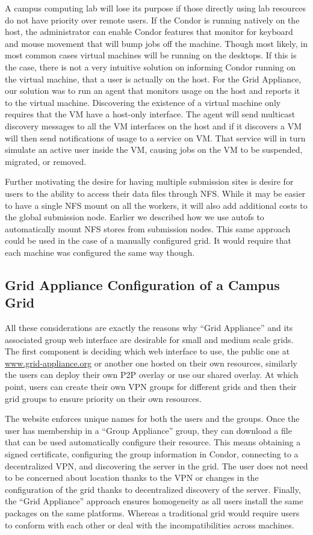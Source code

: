 \documentclass[conference]{IEEEtran}
\begin{document}
A campus computing lab will lose its purpose if those directly using lab
resources do not have priority over remote users.  If the Condor is running
natively on the host, the administrator can enable Condor features that monitor
for keyboard and mouse movement that will bump jobs off the machine.  Though
most likely, in most common cases virtual machines will be running on the
desktops.  If this is the case, there is not a very intuitive solution on
informing Condor running on the virtual machine, that a user is actually on the
host.  For the Grid Appliance, our solution was to run an agent that monitors
usage on the host and reports it to the virtual machine.  Discovering the
existence of a virtual machine only requires that the VM have a host-only
interface.  The agent will send multicast discovery messages to all the VM
interfaces on the host and if it discovers a VM will then send notifications of
usage to a service on VM.  That service will in turn simulate an active user
inside the VM, causing jobs on the VM to be suspended, migrated, or removed.

Further motivating the desire for having multiple submission sites is desire
for users to the ability to access their data files through NFS.  While it may
be easier to have a single NFS mount on all the workers, it will also add
additional costs to the global submission node.  Earlier we described how we
use autofs to automatically mount NFS stores from submission nodes.  This same
approach could be used in the case of a manually configured grid.  It would
require that each machine was configured the same way though.

\subsection{Grid Appliance Configuration of a Campus Grid}

All these considerations are exactly the reasons why ``Grid Appliance'' and its
associated group web interface are desirable for small and medium scale grids.
The first component is deciding which web interface to use, the public one at
\url{www.grid-appliance.org} or another one hosted on their own resources,
similarly the users can deploy their own P2P overlay or use our shared overlay.
At which point, users can create their own VPN groups for different grids and
then their grid groups to ensure priority on their own resources.

The website enforces unique names for both the users and the groups.  Once the
user has membership in a ``Group Appliance'' group, they can download a file
that can be used automatically configure their resource.  This means obtaining
a signed certificate, configuring the group information in Condor, connecting
to a decentralized VPN, and discovering the server in the grid.  The user does
not need to be concerned about location thanks to the VPN or changes in the
configuration of the grid thanks to decentralized discovery of the server.
Finally, the ``Grid Appliance'' approach ensures homogeneity as all users
install the same packages on the same platforms.  Whereas a traditional grid
would require users to conform with each other or deal with the
incompatibilities across machines.
\end{document}
